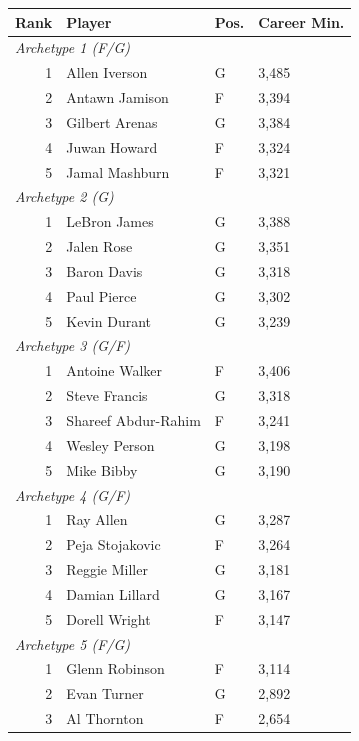 \begin{table}[htbp]
  \centering\small
  \begin{tabular}{rlll}
    \toprule
    Rank & Player & Pos. & Career Min. \\
    \midrule
    \multicolumn{4}{l}{\textit{Archetype 1 (F/G)}} \\
    \midrule
    1 & Allen Iverson & G & 3,485 \\
    2 & Antawn Jamison & F & 3,394 \\
    3 & Gilbert Arenas & G & 3,384 \\
    4 & Juwan Howard & F & 3,324 \\
    5 & Jamal Mashburn & F & 3,321 \\
    \midrule[0.4pt]
    \multicolumn{4}{l}{\textit{Archetype 2 (G)}} \\
    \midrule
    1 & LeBron James & G & 3,388 \\
    2 & Jalen Rose & G & 3,351 \\
    3 & Baron Davis & G & 3,318 \\
    4 & Paul Pierce & G & 3,302 \\
    5 & Kevin Durant & G & 3,239 \\
    \midrule[0.4pt]
    \multicolumn{4}{l}{\textit{Archetype 3 (G/F)}} \\
    \midrule
    1 & Antoine Walker & F & 3,406 \\
    2 & Steve Francis & G & 3,318 \\
    3 & Shareef Abdur-Rahim & F & 3,241 \\
    4 & Wesley Person & G & 3,198 \\
    5 & Mike Bibby & G & 3,190 \\
    \midrule[0.4pt]
    \multicolumn{4}{l}{\textit{Archetype 4 (G/F)}} \\
    \midrule
    1 & Ray Allen & G & 3,287 \\
    2 & Peja Stojakovic & F & 3,264 \\
    3 & Reggie Miller & G & 3,181 \\
    4 & Damian Lillard & G & 3,167 \\
    5 & Dorell Wright & F & 3,147 \\
    \midrule[0.4pt]
    \multicolumn{4}{l}{\textit{Archetype 5 (F/G)}} \\
    \midrule
    1 & Glenn Robinson & F & 3,114 \\
    2 & Evan Turner & G & 2,892 \\
    3 & Al Thornton & F & 2,654 \\

\end{tabular}
\end{table}
